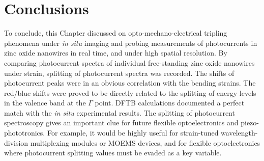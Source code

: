 \section{Conclusions}
To conclude, this Chapter discussed on opto-mechano-electrical tripling phenomena under {\em in situ} imaging and probing measurements of photocurrents in zinc oxide nanowires in real time, and under high spatial resolution. 
By comparing photocurrent spectra of individual free-standing zinc oxide nanowires under strain, splitting of photocurrent spectra was recorded. 
The shifts of photocurrent peaks were in an obvious correlation with the bending strains. 
The red/blue shifts were proved to be directly related to the splitting of energy levels in the valence band at the $\Gamma$ point. 
DFTB calculations documented a perfect match with the {\em in situ} experimental results. 
The splitting of photocurrent spectroscopy gives an important clue for future flexible optoelectronics and piezo-phototronics. 
For example, it would be highly useful for strain-tuned wavelength-division multiplexing modules or MOEMS devices, and for flexible optoelectronics where photocurrent splitting values must be evaded as a key variable. 